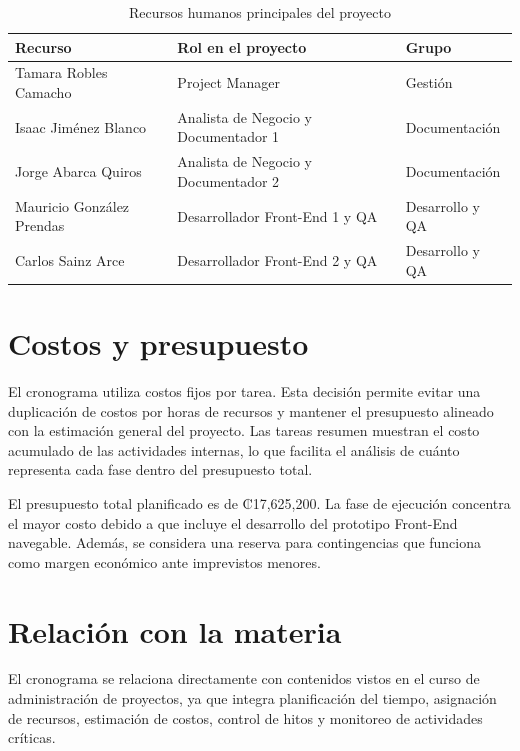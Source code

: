 \documentclass[11pt,spanish]{article}
\begin{document}
\begin{table}[H]
\centering
\caption{Recursos humanos principales del proyecto}
\begin{tabularx}{\textwidth}{p{5cm} Y p{3.8cm}}
\toprule
\textbf{Recurso} & \textbf{Rol en el proyecto} & \textbf{Grupo} \\
\midrule
Tamara Robles Camacho & Project Manager & Gestión \\
Isaac Jiménez Blanco & Analista de Negocio y Documentador 1 & Documentación \\
Jorge Abarca Quiros & Analista de Negocio y Documentador 2 & Documentación \\
Mauricio González Prendas & Desarrollador Front-End 1 y QA & Desarrollo y QA \\
Carlos Sainz Arce & Desarrollador Front-End 2 y QA & Desarrollo y QA \\
\bottomrule
\end{tabularx}
\end{table}

\section{Costos y presupuesto}

El cronograma utiliza costos fijos por tarea. Esta decisión permite evitar una duplicación de costos por horas de recursos y mantener el presupuesto alineado con la estimación general del proyecto. Las tareas resumen muestran el costo acumulado de las actividades internas, lo que facilita el análisis de cuánto representa cada fase dentro del presupuesto total.

El presupuesto total planificado es de ₡17,625,200. La fase de ejecución concentra el mayor costo debido a que incluye el desarrollo del prototipo Front-End navegable. Además, se considera una reserva para contingencias que funciona como margen económico ante imprevistos menores.

\section{Relación con la materia}

El cronograma se relaciona directamente con contenidos vistos en el curso de administración de proyectos, ya que integra planificación del tiempo, asignación de recursos, estimación de costos, control de hitos y monitoreo de actividades críticas.
\end{document}
